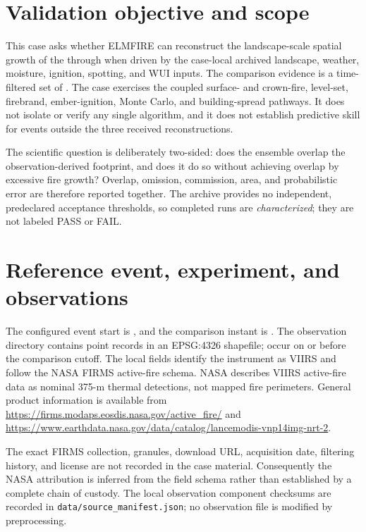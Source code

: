 \section{Validation objective and scope}

This case asks whether ELMFIRE can reconstruct the landscape-scale spatial
growth of the \CaseTitle{} through \SimulationDuration{} when driven by the
case-local archived landscape, weather, moisture, ignition, spotting, and WUI
inputs.  The comparison evidence is a time-filtered set of \ObservationSource{}.
The case exercises the coupled surface- and crown-fire, level-set, firebrand,
ember-ignition, Monte Carlo, and building-spread pathways.  It does not isolate
or verify any single algorithm, and it does not establish predictive skill for
events outside the three received reconstructions.

The scientific question is deliberately two-sided: does the ensemble overlap
the observation-derived footprint, and does it do so without achieving overlap
by excessive fire growth?  Overlap, omission, commission, area, and
probabilistic error are therefore reported together.  The archive provides no
independent, predeclared acceptance thresholds, so completed runs are
\emph{characterized}; they are not labeled PASS or FAIL.

\section{Reference event, experiment, and observations}

The configured event start is \EventStart{}, and the comparison instant is
\ComparisonTime{}.  The observation directory contains
 point records in an
EPSG:4326 shapefile;  occur
on or before the comparison cutoff.  The local fields identify the instrument
as VIIRS and follow the NASA FIRMS active-fire schema.  NASA describes VIIRS
active-fire data as nominal 375-m thermal detections, not mapped fire
perimeters.  General product information is available from
\url{https://firms.modaps.eosdis.nasa.gov/active_fire/} and
\url{https://www.earthdata.nasa.gov/data/catalog/lancemodis-vnp14img-nrt-2}.

The exact FIRMS collection, granules, download URL, acquisition date, filtering
history, and license are not recorded in the case material.  Consequently the
NASA attribution is inferred from the field schema rather than established by
a complete chain of custody.  The local observation component checksums are
recorded in \texttt{data/source\_manifest.json}; no observation file is modified
by preprocessing.

